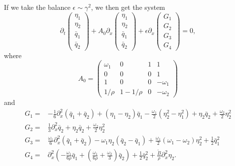 \documentclass[a4paper,11pt]{article}
\newcommand{\bp}{\begin{pmatrix}}
\newcommand{\ep}{\end{pmatrix}}
\newcommand{\p}{\partial}
\begin{document}
If we take the balance $\epsilon \sim \gamma^{2}$, we then get the system 
\[
\p_{t}\bp \eta_{1} \\ \eta_{2} \\ \bar{q}_{1} \\ \bar{q}_{2} \ep +A_{0}\p_{x}\bp \eta_{1} \\ \eta_{2} \\ \bar{q}_{1} \\ \bar{q}_{2} \ep +  \epsilon\p_{x}\bp G_{1} \\ G_{2} \\ G_{3} \\ G_{4} \ep = 0, 
\]
where
\[
A_{0} = \bp \omega_{1} & 0 & 1  & 1 \\ 0 & 0 & 0 & 1 \\ 1 & 0 & 0 & -\omega_{1} \\ 1/\rho & 1-1/\rho & 0 & -\omega_{2}  \ep
\]
and
\begin{align*}
G_{1} = & -\frac{1}{6}\p_{x}^{2}(\bar{q}_{1}+\bar{q}_{2})+  (\eta_{1}-\eta_{2})\bar{q}_{1} - \frac{\omega_{1}}{2}(\eta^{2}_{2}-\eta_{1}^{2}) + \eta_{2}\bar{q}_{2} + \frac{\omega_{2}}{2}\eta_{2}^{2}\\
G_{2} = &  \frac{1}{3} \p_{x}^{2}\bar{q}_{2} + \eta_{2}\bar{q}_{2} + \frac{\omega_{2}}{2}\eta_{2}^{2} \\
G_{3} = &  \frac{\omega_{1}}{6}\p_{x}^{2}(\bar{q}_{1}+\bar{q}_{2}) -  \omega_{1}\eta_{2}(\bar{q}_{2}-\bar{q}_{1}) + \frac{\omega_{1}}{2}(\omega_{1}-\omega_{2})\eta_{2}^{2} + \frac{1}{2}\bar{q}_{1}^{2}\\
G_{4} = &  \p_{x}^{2}\left(-\frac{\omega_{1}}{6\rho}\bar{q}_{1} + \left(\frac{\omega_{1}}{6\rho} + \frac{\omega_{2}}{3} \right)\bar{q}_{2}\right)  + \frac{1}{2}\bar{q}_{2}^{2} +\frac{\tilde{B}}{\rho}\p_{x}^{2}\eta_{2}.
\end{align*}
\end{document}
